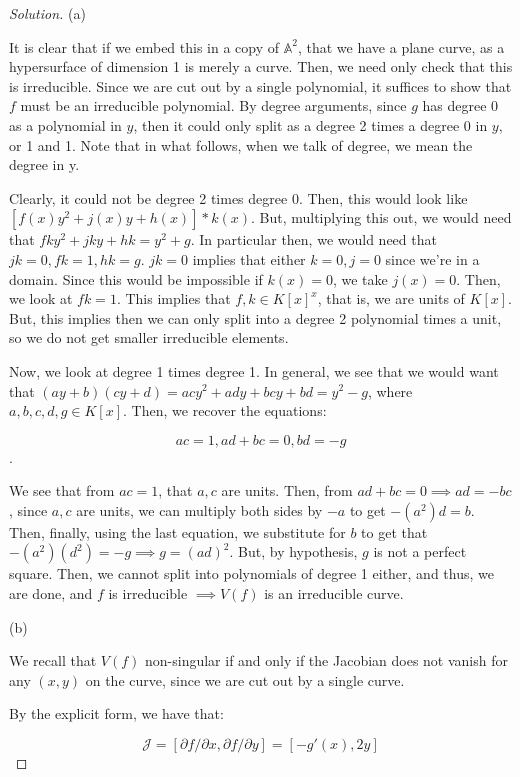 \documentclass[10pt]{article}
\begin{document}
\begin{proof}[Solution]

(a)

It is clear that if we embed this in a copy of $\mathbb{A}^2$, that we have a plane curve, as a hypersurface of dimension 1 is merely a curve. Then, we need only check that this is irreducible. Since we are cut out by a single polynomial, it suffices to show that $f$ must be an irreducible polynomial. By degree arguments, since $g$ has degree 0 as a polynomial in $y$, then it could only split as a degree 2 times a degree 0 in $y$, or 1 and 1. Note that in what follows, when we talk of degree, we mean the degree in y.

Clearly, it could not be degree 2 times degree 0. Then, this would look like $[f(x) y^2 + j(x) y + h(x)] * k(x)$. But, multiplying this out, we would need that $fk y^2 + jk y + hk = y^2 + g$. In particular then, we would need that $jk = 0, fk = 1, hk = g$. $jk = 0$ implies that either $k = 0, j = 0$ since we're in a domain. Since this would be impossible if $k(x) = 0$, we take $j(x) = 0$. Then, we look at $fk = 1$. This implies that $f,k \in K[x]^x$, that is, we are units of $K[x]$. But, this implies then we can only split into a degree 2 polynomial times a unit, so we do not get smaller irreducible elements.

Now, we look at degree 1 times degree 1. In general, we see that we would want that $(ay + b)(cy + d) = acy^2 + ady + bcy + bd = y^2 - g$, where $a,b,c,d, g \in K[x]$. Then, we recover the equations:

$$ ac = 1, ad + bc  = 0, bd = -g$$.

We see that from $ac = 1$, that $a,c$ are units. Then, from $ad + bc = 0 \implies ad = -bc$, since $a,c$ are units, we can multiply both sides by $-a$ to get $- (a^2) d = b$. Then, finally, using the last equation, we substitute for $b$ to get that $- (a^2)(d^2) = -g \implies g = (ad)^2$. But, by hypothesis, $g$ is not a perfect square. Then, we cannot split into polynomials of degree 1 either, and thus, we are done, and $f$ is irreducible $\implies V(f)$ is an irreducible curve.

(b)

We recall that $V(f)$ non-singular if and only if the Jacobian does not vanish for any $(x,y)$ on the curve, since we are cut out by a single curve.

By the explicit form, we have that:

$$ \mathcal{J} = [ \partial f/ \partial x , \partial f / \partial y ] = [ -g'(x), 2y] $$


\end{proof}
\end{document}

